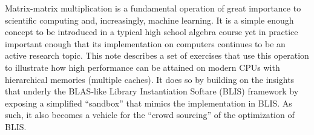 Matrix-matrix multiplication is a fundamental operation of great importance to scientific computing and, increasingly, machine learning.  
It is a simple enough concept to be introduced in a typical high school algebra course yet in practice important enough that its implementation on computers continues to be an active research topic.
This note describes a set of exercises that use this operation to illustrate how high performance can be attained on modern CPUs with hierarchical memories (multiple caches).  It does so by building on the insights that underly the BLAS-like Library Instantiation Softare (BLIS) framework by exposing a simplified ``sandbox'' that mimics the implementation in BLIS.
As such, it also becomes a vehicle for the ``crowd sourcing'' of the optimization of BLIS.

